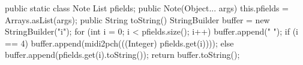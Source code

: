 public static class Note {
        List pfields;
        public Note(Object... args) {
            this.pfields = Arrays.asList(args);
        }
        public String toString() {
            StringBuilder buffer = new StringBuilder("i");
            for (int i = 0; i < pfields.size(); i++) {
                buffer.append(" ");
                if (i == 4) {
                    buffer.append(midi2pch(((Integer) pfields.get(i))));
                } else {
                    buffer.append(pfields.get(i).toString());
                }
            }
            return buffer.toString();
        }
    }